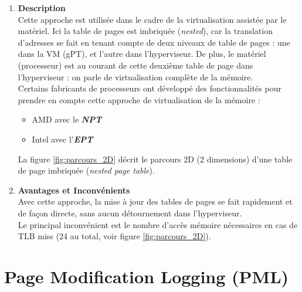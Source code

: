 \begin{enumerate}[label=\textbf{(\roman*)}]
    \item \textbf{Description}\\
Cette approche est utilisée dans le cadre de la virtualisation assistée par le matériel. Ici la table de pages est imbriquée (\textit{nested}), car la translation d'adresses se fait en tenant compte de deux niveaux de table de pages : une dans la VM (\acs{gPT}), et l'autre dans l'hyperviseur. De plus, le matériel (processeur) est au courant de cette deuxième table de page dans l'hyperviseur : on parle de virtualisation complète de la mémoire.\\
Certains fabricants de processeurs ont développé des fonctionnalités pour prendre en compte cette approche de virtualisation de la mémoire :
    \begin{itemize}
        \item AMD avec le \textit{\textbf{\ac{NPT}}}
        \item Intel avec l'\textit{\textbf{\ac{EPT}}}
    \end{itemize}
    
    La figure \ref{fig:parcours_2D} décrit le parcours 2D (2 dimensions) d'une table de page imbriquée (\textit{nested page table}).

    \item \textbf{Avantages et Inconvénients}\\
    Avec cette approche, la mise à jour des tables de pages se fait rapidement et de façon directe, sans aucun détournement dans l'hyperviseur.\\
    Le principal inconvénient est le nombre d'accès mémoire nécessaires en cas de TLB miss (24 au total, voir figure \ref{fig:parcours_2D}).
\end{enumerate}

\section{Page Modification Logging (PML)}
